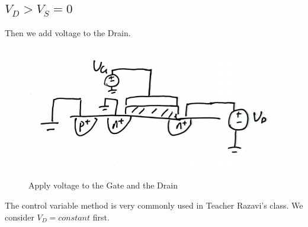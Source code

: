 \documentclass[fontset=windows]{article}
\begin{document}
\subsection*{$V_D>V_S=0$}

Then we add voltage to the Drain.

\begin{figure}[htbp]
    \centering
    \includegraphics[scale=0.6]{5.jpg}
    \captionsetup{labelformat=empty}
    \caption{Apply voltage to the Gate and the Drain}
    \label{5}
\end{figure}

The control variable method is very commonly used in Teacher Razavi's class.
We consider $V_D=constant$ first.
\end{document}
